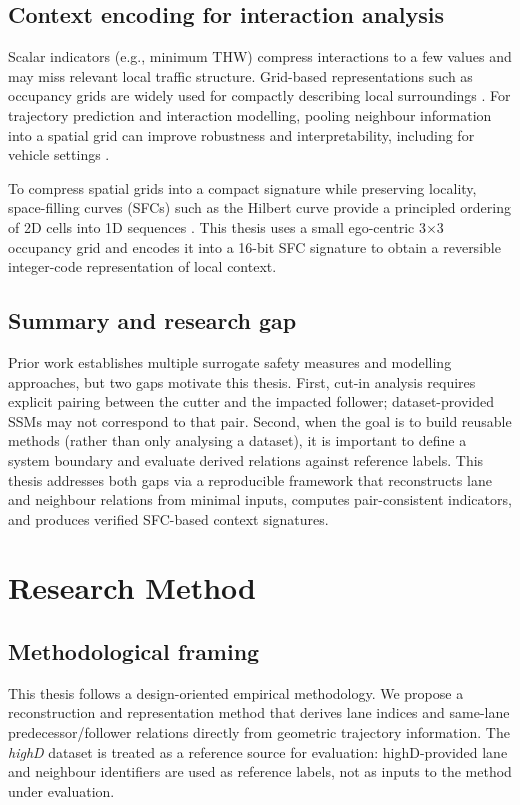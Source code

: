 \documentclass[12pt,a4paper,twoside,openright]{report}
\begin{document}
    \section{Context encoding for interaction analysis}
    Scalar indicators (e.g., minimum THW) compress interactions to a few values and may miss relevant local traffic structure. Grid-based representations such as occupancy grids are widely used for compactly describing local surroundings \cite{elfes1989}. For trajectory prediction and interaction modelling, pooling neighbour information into a spatial grid can improve robustness and interpretability, including for vehicle settings \cite{deo2018}.

    To compress spatial grids into a compact signature while preserving locality, space-filling curves (SFCs) such as the Hilbert curve provide a principled ordering of 2D cells into 1D sequences \cite{hilbert1891,moon2001}. This thesis uses a small ego-centric 3$\times$3 occupancy grid and encodes it into a 16-bit SFC signature to obtain a reversible integer-code representation of local context.

    \section{Summary and research gap}
    Prior work establishes multiple surrogate safety measures and modelling approaches, but two gaps motivate this thesis. First, cut-in analysis requires explicit pairing between the cutter and the impacted follower; dataset-provided SSMs may not correspond to that pair. Second, when the goal is to build reusable methods (rather than only analysing a dataset), it is important to define a system boundary and evaluate derived relations against reference labels. This thesis addresses both gaps via a reproducible framework that reconstructs lane and neighbour relations from minimal inputs, computes pair-consistent indicators, and produces verified SFC-based context signatures.

    \chapter{Research Method}
    \label{chap:researchmethod}

    \section{Methodological framing}
    This thesis follows a design-oriented empirical methodology. We propose a reconstruction and representation method that derives lane indices and same-lane predecessor/follower relations directly from geometric trajectory information. The \textit{highD} dataset is treated as a reference source for evaluation: highD-provided lane and neighbour identifiers are used as reference labels, not as inputs to the method under evaluation.
\end{document}
